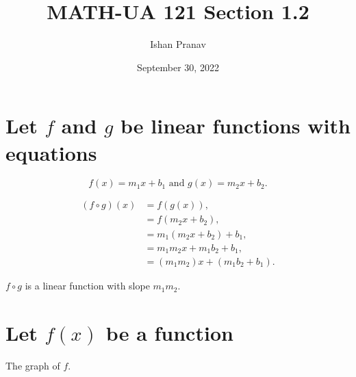\documentclass[12pt]{article}
\title{MATH-UA 121 Section 1.2}
\author{Ishan Pranav}
\date{September 30, 2022}
\begin{document}
\maketitle
\section{Let $f$ and $g$ be linear functions with equations}

\[f(x)=m_1x+b_1\text{ and }g(x)=m_2x+b_2.\]

\begin{align*}
    (f\circ g)(x)
    &=f(g(x)),\\
    &=f(m_2x+b_2),\\
    &=m_1(m_2x+b_2)+b_1,\\
    &=m_1m_2x+m_1b_2+b_1,\\
    &=(m_1m_2)x+(m_1b_2+b_1).
\end{align*}

$f\circ g$ is a linear function with slope $m_1m_2$.
\section{Let $f(x)$ be a function}
The graph of $f$.
\end{document}
